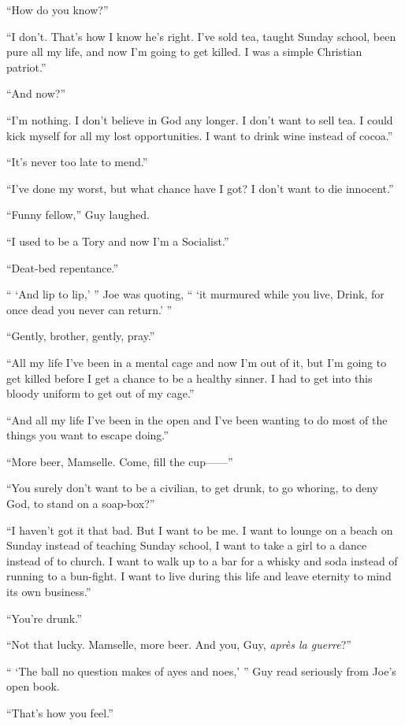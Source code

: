 ``How do you know?''

``I don't. That's how I know he's right. I've sold tea, taught Sunday school, been pure all my life, and now I'm going to get killed. I was a simple Christian patriot.''

``And now?''

``I'm nothing. I don't believe in God any longer. I don't want to sell tea. I could kick myself for all my lost opportunities. I want to drink wine instead of cocoa.''

``It's never too late to mend.''

``I've done my worst, but what chance have I got? I don't want to die innocent.''

``Funny fellow,'' Guy laughed.

``I used to be a Tory and now I'm a Socialist.''

``Deat-bed repentance.''

`` `And lip to lip,' '' Joe was quoting, `` `it murmured while you live, Drink, for once dead you never can return.' ''

``Gently, brother, gently, pray.''

``All my life I've been in a mental cage and now I'm out of it, but I'm going to get killed before I get a chance to be a healthy sinner. I had to get into this bloody uniform to get out of my cage.''

``And all my life I've been in the open and I've been wanting to do most of the things you want to escape doing.''

``More beer, Mamselle. Come, fill the cup------''

``You surely don't want to be a civilian, to get drunk, to go whoring, to deny God, to stand on a soap-box?''

``I haven't got it that bad. But I want to be me. I want to lounge on a beach on Sunday instead of teaching Sunday school, I want to take a girl to a dance instead of to church. I want to walk up to a bar for a whisky and soda instead of running to a bun-fight. I want to live during this life and leave eternity to mind its own business.''

``You're drunk.''

``Not that lucky. Mamselle, more beer. And you, Guy, \textit{apr\`{e}s la guerre}?''

`` `The ball no question makes of ayes and noes,' '' Guy read seriously from Joe's open book.

``That's how you feel.''


